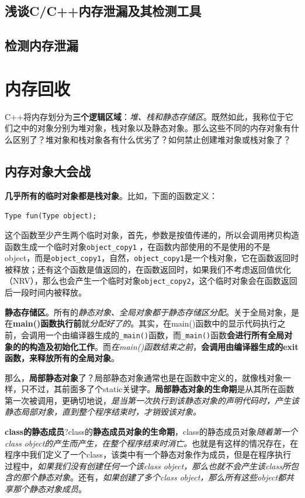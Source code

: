 \documentclass[UTF8,a4paper,12pt]{ctexbook}
\begin{document}
		\subsection{浅谈C/C++内存泄漏及其检测工具}

		\subsection{检测内存泄漏}



	\section{内存回收}
		C++将内存划分为\textbf{三个逻辑区域}：\textit{堆、栈和静态存储区}。既然如此，我称位于它们之中的对象分别为堆对象，栈对象以及静态对象。那么这些不同的内存对象有什么区别了？堆对象和栈对象各有什么优劣了？如何禁止创建堆对象或栈对象了？
		
		\subsection{内存对象大会战}
			\textbf{几乎所有的临时对象都是栈对象}。比如，下面的函数定义：
			
			\verb|Type fun(Type object);|
			
			这个函数至少产生两个临时对象，首先，参数是按值传递的，所以会调用拷贝构造函数生成一个临时对象\verb|object_copy1| ，在函数内部使用的不是使用的不是object，而是\verb|object_copy1|，自然，\verb|object_copy1|是一个栈对象，它在函数返回时被释放；还有这个函数是值返回的，在函数返回时，如果我们不考虑返回值优化（NRV），那么也会产生一个临时对象\verb|object_copy2|，这个临时对象会在函数返回后一段时间内被释放。
			
			\textbf{静态存储区}。所有的\textit{静态对象、全局对象都于静态存储区分配}。关于全局对象，是在\textbf{main()函数执行前}就\textit{分配好了的}。其实，在main()函数中的显示代码执行之前，会调用一个由编译器生成的\verb|_main()|函数，而\verb|_main()|函数\textbf{会进行所有全局对象的的构造及初始化工作}。而\textit{在main()函数结束之前}，\textbf{会调用由编译器生成的exit函数，来释放所有的全局对象}。
			
			那么，\textbf{局部静态对象}了？局部静态对象通常也是在函数中定义的，就像栈对象一样，只不过，其前面多了个static关键字。\textbf{局部静态对象的生命期}是从其所在函数第一次被调用，更确切地说，\textit{是当第一次执行到该静态对象的声明代码时，产生该静态局部对象，直到整个程序结束时，才销毁该对象。}
			
			\textbf{class的静态成员}?class的\textbf{静态成员对象的生命期}，class的静态成员对象\textit{随着第一个class object的产生而产生，在整个程序结束时消亡。}也就是有这样的情况存在，在程序中我们定义了一个class，该类中有一个静态对象作为成员，但是在程序执行过程中，\textit{如果我们没有创建任何一个该class object，那么也就不会产生该class所包含的那个静态对象}。还有，\textit{如果创建了多个class object，那么所有这些object都共享那个静态对象成员}。
			
\end{document}
